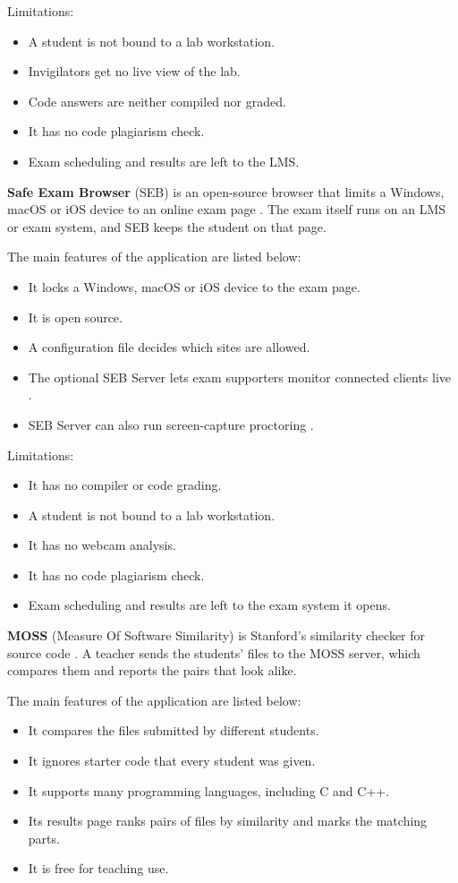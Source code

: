 \noindent Limitations:
\begin{itemize}[noitemsep]
\item A student is not bound to a lab workstation.
\item Invigilators get no live view of the lab.
\item Code answers are neither compiled nor graded.
\item It has no code plagiarism check.
\item Exam scheduling and results are left to the LMS.
\end{itemize}

\noindent\textbf{Safe Exam Browser} (SEB) is an open-source browser that limits a Windows, macOS or iOS device to an online exam page \cite{seb1}. The exam itself runs on an LMS or exam system, and SEB keeps the student on that page.

\noindent The main features of the application are listed below:
\begin{itemize}[noitemsep]
\item It locks a Windows, macOS or iOS device to the exam page.
\item It is open source.
\item A configuration file decides which sites are allowed.
\item The optional SEB Server lets exam supporters monitor connected clients live \cite{sebserver1}.
\item SEB Server can also run screen-capture proctoring \cite{sebserver1}.
\end{itemize}

\noindent Limitations:
\begin{itemize}[noitemsep]
\item It has no compiler or code grading.
\item A student is not bound to a lab workstation.
\item It has no webcam analysis.
\item It has no code plagiarism check.
\item Exam scheduling and results are left to the exam system it opens.
\end{itemize}

\noindent\textbf{MOSS} (Measure Of Software Similarity) is Stanford's similarity checker for source code \cite{moss1}. A teacher sends the students' files to the MOSS server, which compares them and reports the pairs that look alike.

\noindent The main features of the application are listed below:
\begin{itemize}[noitemsep]
\item It compares the files submitted by different students.
\item It ignores starter code that every student was given.
\item It supports many programming languages, including C and C++.
\item Its results page ranks pairs of files by similarity and marks the matching parts.
\item It is free for teaching use.
\end{itemize}

